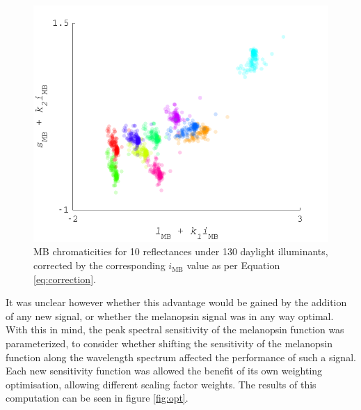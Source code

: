 \begin{figure}[htbp]
    \includegraphics[max width=\textwidth]{figs/comp/transformToIllIndSpace/correctedChromaticities.pdf}
    \caption{\gls{MB} chromaticities for 10 reflectances under 130 daylight illuminants, corrected by the corresponding $i_{\text{MB}}$ value as per Equation \ref{eq:correction}.}
    \label{fig:corrected}
\end{figure} 


It was unclear however whether this advantage would be gained by the addition of any new signal, or whether the melanopsin signal was in any way optimal. With this in mind, the peak spectral sensitivity of the melanopsin function was parameterized, to consider whether shifting the sensitivity of the melanopsin function along the wavelength spectrum affected the performance of such a signal. Each new sensitivity function was allowed the benefit of its own weighting optimisation, allowing different scaling factor weights. The results of this computation can be seen in figure \ref{fig:opt}. 

